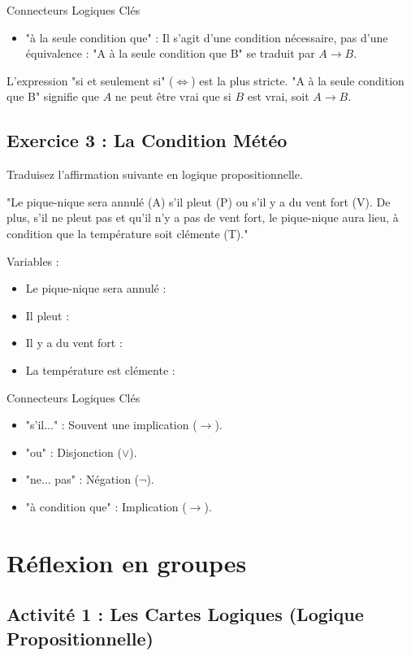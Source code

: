 Connecteurs Logiques Clés\\
\begin{itemize}
    \item "à la seule condition que" : Il s'agit d'une condition nécessaire, pas d'une équivalence : "A à la seule condition que B" se traduit par \( A \rightarrow B \).
\end{itemize}
\begin{Comprendre}
  L'expression "si et seulement si" (\( \Leftrightarrow \)) est la plus stricte. "A à la seule condition que B" signifie que \( A \) ne peut être vrai que si \( B \) est vrai, soit \( A \rightarrow B \).  
\end{Comprendre}

\subsection*{Exercice 3 : La Condition Météo}
Traduisez l'affirmation suivante en logique propositionnelle.
\begin{center}
"Le pique-nique sera annulé (A) s'il pleut (P) ou s'il y a du vent fort (V). De plus, s'il ne pleut pas et qu'il n'y a pas de vent fort, le pique-nique aura lieu, à condition que la température soit clémente (T)."
\end{center}
Variables :
\begin{itemize}
    \item Le pique-nique sera annulé :
    \item Il pleut :
    \item Il y a du vent fort :
    \item La température est clémente :
\end{itemize}


Connecteurs Logiques Clés
\begin{itemize}
    \item  "s'il..." : Souvent une implication ($\rightarrow$).
    \item "ou" : Disjonction ($\lor$).
    \item  "ne... pas" : Négation ($\neg$).
    \item "à condition que" : Implication ($\rightarrow$).
\end{itemize}
    


\section*{Réflexion en groupes }
\subsection*{Activité 1 : Les Cartes Logiques (Logique Propositionnelle)}

